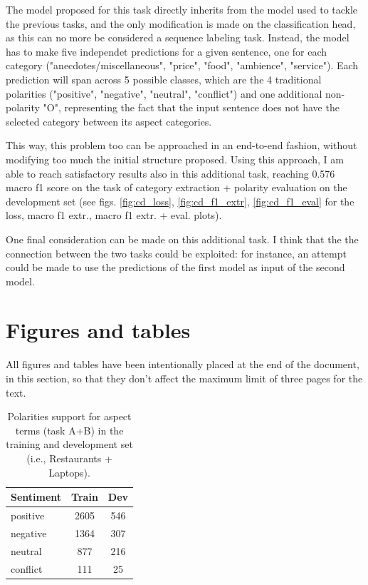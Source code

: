 \documentclass[11pt,a4paper]{article}
\begin{document}
	The model proposed for this task directly inherits from the model used to tackle the previous tasks, and the only modification is made on the classification head, as this can no more be considered a sequence labeling task. Instead, the model has to make five independet predictions for a given sentence, one for each category ("anecdotes/miscellaneous", "price", "food", "ambience", "service"). Each prediction will span across 5 possible classes, which are the 4 traditional polarities ("positive", "negative", "neutral", "conflict") and one additional non-polarity "O", representing the fact that the input sentence does not have the selected category between its aspect categories.
	
	This way, this problem too can be approached in an end-to-end fashion, without modifying too much the initial structure proposed. Using this approach, I am able to reach satisfactory results also in this additional task, reaching 0.576 macro f1 score on the task of category extraction + polarity evaluation on the development set (see figs. \ref{fig:cd_loss}, \ref{fig:cd_f1_extr}, \ref{fig:cd_f1_eval} for the loss, macro f1 extr., macro f1 extr. + eval. plots).
	
	One final consideration can be made on this additional task. I think that the the connection between the two tasks could be exploited: for instance, an attempt could be made to use the predictions of the first model as input of the second model.
	
	\clearpage
	\section{Figures and tables}
	All figures and tables have been intentionally placed at the end of the
	document, in this section, so that they don't affect the maximum limit of three
	pages for the text.
	
	\begin{table}[H]
		\centering
		\begin{tabular}{@{}lcc@{}}
			\toprule
			\textbf{Sentiment} & Train & Dev \\ \midrule
			positive           & 2605  & 546 \\
			negative           & 1364  & 307 \\
			neutral            & 877   & 216 \\
			conflict           & 111   & 25  \\ \bottomrule
		\end{tabular}
		\caption{Polarities support for aspect terms (task A+B) in the training and development set (i.e., Restaurants + Laptops).}
		\label{tab:ab_polarities_support}
	\end{table}
\end{document}
